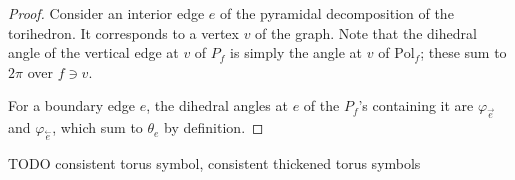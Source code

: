 \documentclass[11pt]{amsart}
\newcommand{\cev}[1]{\overset{\leftarrow}{#1}}
\newcommand{\vphi}{\varphi}
\newcommand{\Pol}{{\text{Pol}}}
\theoremstyle{plain}
\theoremstyle{definition}
\begin{document}
\begin{proof}
Consider an interior edge $e$ of the pyramidal decomposition
of the torihedron.
It corresponds to a vertex $v$ of the graph.
Note that the dihedral angle of the vertical edge
at $v$ of $P_f$ is simply the angle at $v$ of $\Pol_f$;
these sum to $2\pi$ over $f \ni v$.


For a boundary edge $e$, the dihedral angles at $e$ of the $P_f$'s
containing it are $\vphi_{\vec{e}}$ and $\vphi_{\cev{e}}$,
which sum to $\theta_e$ by definition.

\end{proof}






TODO consistent torus symbol, consistent thickened torus symbols
\end{document}
